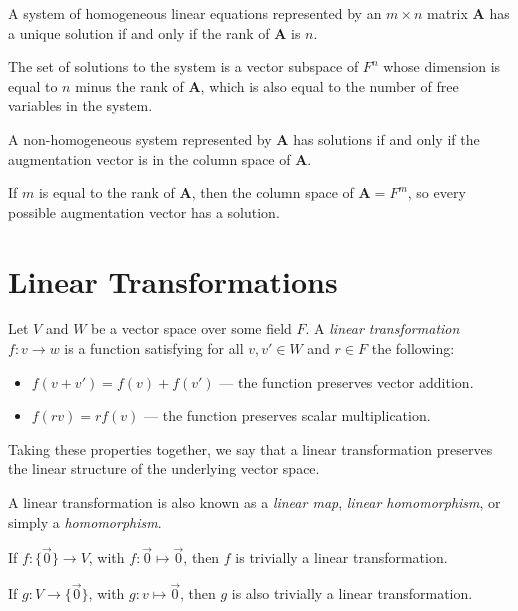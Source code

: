 \documentclass[12pt]{article}
\begin{document}
\begin{rmk}
    A system of homogeneous linear equations represented by an $m \times n$ matrix $\boldsymbol{A}$ has a unique solution if and only if the rank of $\boldsymbol{A}$ is $n$.

    The set of solutions to the system is a vector subspace of $F^n$ whose dimension is equal to $n$ minus the rank of $\boldsymbol{A}$, which is also equal to the number of free variables in the system.

    A non-homogeneous system represented by $\boldsymbol{A}$ has solutions if and only if the augmentation vector is in the column space of $\boldsymbol{A}$.

    If $m$ is equal to the rank of $\boldsymbol{A}$, then the column space of $\boldsymbol{A} = F^m$, so every possible augmentation vector has a solution.
\end{rmk}

\section{Linear Transformations}

\begin{defn}\label{linear-transformation}
    Let $V$ and $W$ be a vector space over some field $F$. A \emph{linear transformation} $f: v \to w$ is a function satisfying for all $v, v' \in W$ and $r \in F$ the following:
    \begin{itemize}
        \item $f(v + v') = f(v) + f(v')$ --- the function preserves vector addition.
        \item $f(rv) = rf(v)$ --- the function preserves scalar multiplication.
    \end{itemize}
    Taking these properties together, we say that a linear transformation preserves the linear structure of the underlying vector space.

    A linear transformation is also known as a \emph{linear map}, \emph{linear homomorphism}, or simply a \emph{homomorphism}.
\end{defn}

\begin{exmp}\proofbreak
    If $f: \{\vec{0}\} \to V$, with $f: \vec{0} \mapsto \vec{0}$, then $f$ is trivially a linear transformation.

    If $g: V \to \{\vec{0}\}$, with $g: v \mapsto \vec{0}$, then $g$ is also trivially a linear transformation.
\end{exmp}
\end{document}
